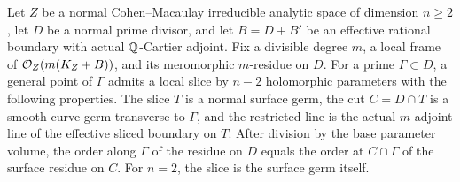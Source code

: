 \begin{lemma}
\label{lem:adjunction-slice}
Let \(Z\) be a normal Cohen--Macaulay irreducible analytic space of
dimension \(n\geq2\), let \(D\) be a normal prime divisor, and let
\(B=D+B'\) be an effective rational boundary with actual
\(\mathbb Q\)-Cartier adjoint.  Fix a divisible degree \(m\), a local frame of
\(\mathcal O_Z(m(K_Z+B))\), and its meromorphic \(m\)-residue on \(D\).
For a prime \(\Gamma\subset D\), a general point of \(\Gamma\) admits a
local slice by \(n-2\) holomorphic parameters with the following properties.
The slice \(T\) is a normal surface germ, the cut \(C=D\cap T\) is a
smooth curve germ transverse to \(\Gamma\), and the restricted line is
the actual \(m\)-adjoint line of the effective sliced boundary on \(T\).
After division by the base parameter volume, the order along \(\Gamma\)
of the residue on \(D\) equals the order at \(C\cap\Gamma\) of the
surface residue on \(C\).  For \(n=2\), the slice is the surface germ
itself.
\end{lemma}
